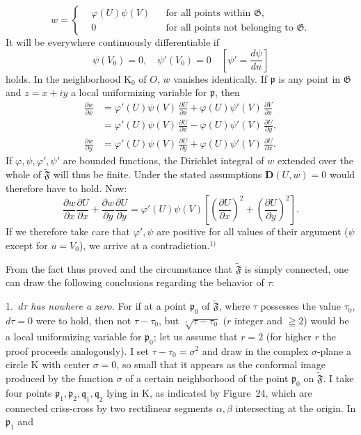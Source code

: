 \documentclass{article}
\begin{document}
\[ w = \left\{ \begin{aligned} &\varphi(U)\psi(V) &&\text{for all points within } \mathfrak{G}, \\ &0 &&\text{for all points not belonging to } \mathfrak{G} \text{.} \end{aligned} \right. \]
It will be everywhere continuously differentiable if
\[ \psi(V_0) = 0, \quad \psi'(V_0) = 0 \quad \left[ \psi' = \frac{d\psi}{du} \right] \]
holds. In the neighborhood $\mathrm{K}_0$ of $O$, $w$ vanishes identically. If $\mathfrak{p}$ is any point in $\mathfrak{G}$ and $z = x + iy$ a local uniformizing variable for $\mathfrak{p}$, then
\[ \begin{aligned} \frac{\partial w}{\partial x} &= \varphi'(U)\psi(V)\,\frac{\partial U}{\partial x} + \varphi(U)\psi'(V)\,\frac{\partial V}{\partial x} \\ &= \varphi'(U)\psi(V)\,\frac{\partial U}{\partial x} - \varphi(U)\psi'(V)\,\frac{\partial U}{\partial y}, \\ \frac{\partial w}{\partial y} &= \varphi'(U)\psi(V)\,\frac{\partial U}{\partial y} + \varphi(U)\psi'(V)\,\frac{\partial U}{\partial x}. \end{aligned} \]
If $\varphi, \psi, \varphi', \psi'$ are bounded functions, the Dirichlet integral of $w$ extended over the whole of $\widetilde{\mathfrak{F}}$ will thus be finite. Under the stated assumptions $\mathbf{D}(U, w) = 0$ would therefore have to hold. Now:
\[ \frac{\partial w}{\partial x} \frac{\partial U}{\partial x} + \frac{\partial w}{\partial y} \frac{\partial U}{\partial y} = \varphi'(U)\psi(V)\left[ \left(\frac{\partial U}{\partial x}\right)^2 + \left(\frac{\partial U}{\partial y}\right)^2 \right]. \]
If we therefore take care that $\varphi', \psi$ are positive for all values of their argument ($\psi$ except for $u = V_0$), we arrive at a contradiction.${}^{1)}$

From the fact thus proved and the circumstance that $\widetilde{\mathfrak{F}}$ is simply connected, one can draw the following conclusions regarding the behavior of $\tau$:

1.\ \emph{$d\tau$ has nowhere a zero.} For if at a point $\mathfrak{p}_0$ of $\widetilde{\mathfrak{F}}$, where $\tau$ possesses the value $\tau_0$, $d\tau = 0$ were to hold, then not $\tau - \tau_0$, but $\sqrt[r]{\tau - \tau_0}$ ($r$ integer and $\geqq 2$) would be a local uniformizing variable for $\mathfrak{p}_0$; let us assume that $r = 2$ (for higher $r$ the proof proceeds analogously). I set $\tau - \tau_0 = \sigma^2$ and draw in the complex $\sigma$-plane a circle $\mathrm{K}$ with center $\sigma = 0$, so small that it appears as the conformal image produced by the function $\sigma$ of a certain neighborhood of the point $\mathfrak{p}_0$ on $\widetilde{\mathfrak{F}}$. I take four points $\mathfrak{p}_1, \mathfrak{p}_2, \mathfrak{q}_1, \mathfrak{q}_2$ lying in $\mathrm{K}$, as indicated by Figure~24, which are connected criss-cross by two rectilinear segments $\alpha, \beta$ intersecting at the origin. In $\mathfrak{p}_1$ and
\end{document}
